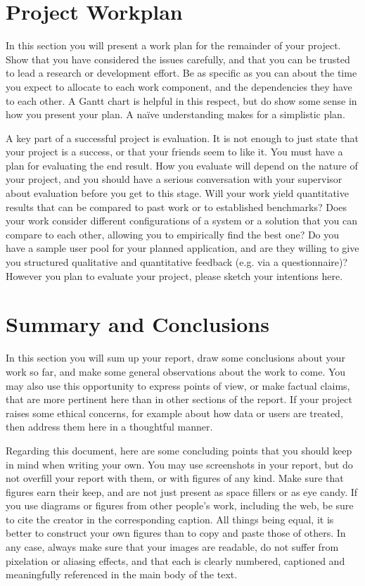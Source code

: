\documentclass[]{UCD_CS_FYP_Report}
\begin{document}
\chapter{Project Workplan}
In this section you will present a work plan for the remainder of your project. Show that you have considered the issues carefully, and that you can be trusted to lead a research or development effort. Be as specific as you can about the time you expect to allocate to each work component, and the dependencies they have to each other. A Gantt chart is helpful in this respect, but do show some sense in how you present your plan. A naïve understanding makes for a simplistic plan.

A key part of a successful project is evaluation. It is not enough to just state that your project is a success, or that your friends seem to like it. You must have a plan for evaluating the end result. How you evaluate will depend on the nature of your project, and you should have a serious conversation with your supervisor about evaluation before you get to this stage. Will your work yield quantitative results that can be compared to past work or to established benchmarks? Does your work consider different configurations of a system or a solution that you can compare to each other, allowing you to empirically find the best one? Do you have a sample user pool for your planned application, and are they willing to give you structured qualitative and quantitative feedback (e.g. via a questionnaire)? However you plan to evaluate your project, please sketch your intentions here.

\chapter{Summary and Conclusions}
In this section you will sum up your report, draw some conclusions about your work so far, and make some general observations about the work to come. You may also use this opportunity to express points of view, or make factual claims, that are more pertinent here than in other sections of the report. If your project raises some ethical concerns, for example about how data or users are treated, then address them here in a thoughtful manner.

Regarding this document, here are some concluding points that you should keep in mind when writing your own. You may use screenshots in your report, but do not overfill your report with them, or with figures of any kind. Make sure that figures earn their keep, and are not just present as space fillers or as eye candy. If you use diagrams or figures from other people’s work, including the web, be sure to cite the creator in the corresponding caption. All things being equal, it is better to construct your own figures than to copy and paste those of others. In any case, always make sure that your images are readable, do not suffer from pixelation or aliasing effects, and that each is clearly numbered, captioned and meaningfully referenced in the main body of the text.
\end{document}
